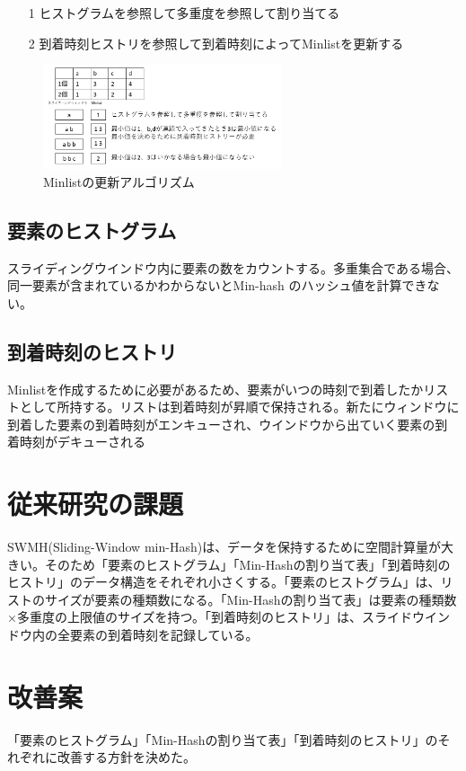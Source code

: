 \documentclass{interim} %
\begin{document}
\begin{itemize}
	\item[1] ヒストグラムを参照して多重度を参照して割り当てる
	\item[2] 到着時刻ヒストリを参照して到着時刻によってMinlistを更新する
\end{itemize}

\begin{figure}[t]
	\centering
	\includegraphics[width=7cm]{minlist.png}
	\caption{Minlistの更新アルゴリズム}
	\label{minlist}
\end{figure}

\subsection{要素のヒストグラム}
スライディングウインドウ内に要素の数をカウントする。多重集合である場合、同一要素が含まれているかわからないとMin-hash のハッシュ値を計算できない。

\subsection{到着時刻のヒストリ}
Minlistを作成するために必要があるため、要素がいつの時刻で到着したかリストとして所持する。リストは到着時刻が昇順で保持される。新たにウィンドウに到着した要素の到着時刻がエンキューされ、ウインドウから出ていく要素の到着時刻がデキューされる

\section{従来研究の課題}
SWMH(Sliding-Window min-Hash)は、データを保持するために空間計算量が大きい。そのため「要素のヒストグラム」「Min-Hashの割り当て表」「到着時刻のヒストリ」のデータ構造をそれぞれ小さくする。「要素のヒストグラム」は、リストのサイズが要素の種類数になる。「Min-Hashの割り当て表」は要素の種類数×多重度の上限値のサイズを持つ。「到着時刻のヒストリ」は、スライドウインドウ内の全要素の到着時刻を記録している。

\section{改善案}
「要素のヒストグラム」「Min-Hashの割り当て表」「到着時刻のヒストリ」のそれぞれに改善する方針を決めた。
\end{document}
